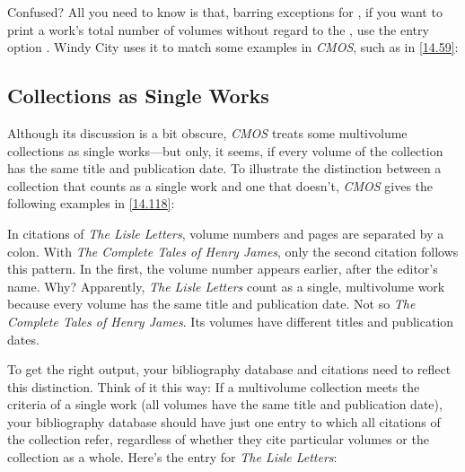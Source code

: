 \documentclass[11pt,letterpaper,oneside]{article}
\begin{document}
Confused? All you need to know is that, barring exceptions for
, if you want to print a work's total number of volumes
without regard to the , use the entry option
. Windy City uses it to match some examples in
\textit{CMOS}, such as in \ref{14.59}:

\begin{citeonly}
\item \cite[1:126]{shurtleff1853}
\end{citeonly}

\subsection{Collections as Single Works}
\label{multivolume}

Although its discussion is a bit obscure, \textit{CMOS} treats some
multivolume collections as single works---but only, it seems, if every
volume of the collection has the same title and publication date. To
illustrate the distinction between a collection that counts as a
single work and one that doesn't, \textit{CMOS} gives the following
examples in \ref{14.118}:

\begin{citeonly}
\item \cite[4:243]{byrne1981}
\item \cite*[32--33]{james1963.5}
\item \cite[4:245]{byrne1981}
\item \cite*[34]{james1963.5}
\end{citeonly}

In citations of \textit{The Lisle Letters}, volume numbers and pages
are separated by a colon. With \textit{The Complete Tales of Henry
James}, only the second citation follows this pattern. In the first,
the volume number appears earlier, after the editor's name. Why?
Apparently, \textit{The Lisle Letters} count as a single, multivolume
work because every volume has the same title and publication date. Not
so \textit{The Complete Tales of Henry James}. Its volumes have
different titles and publication dates.

To get the right output, your bibliography database and citations need
to reflect this distinction. Think of it this way: If a multivolume
collection meets the criteria of a single work (all volumes have the
same title and publication date), your bibliography database should
have just one entry to which all citations of the collection refer,
regardless of whether they cite particular volumes or the collection
as a whole. Here's the entry for \textit{The Lisle Letters}:
\end{document}
